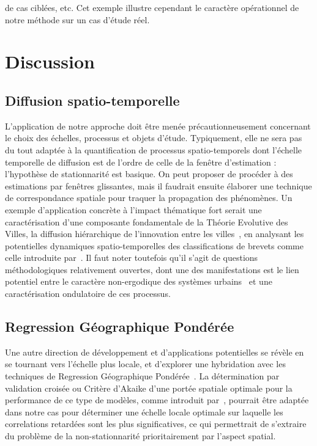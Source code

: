 \documentclass[english]{./sageo}
\begin{document}
de cas ciblées, etc. Cet exemple illustre cependant le caractère opérationnel de notre méthode sur un cas d'étude réel.
 




\section{Discussion}


\subsection{Diffusion spatio-temporelle}


L'application de notre approche doit être menée précautionneusement concernant le choix des échelles, processus et objets d'étude. Typiquement, elle ne sera pas du tout adaptée à la quantification de processus spatio-temporels dont l'échelle temporelle de diffusion est de l'ordre de celle de la fenêtre d'estimation : l'hypothèse de stationnarité est basique. On peut proposer de procéder à des estimations par fenêtres glissantes, mais il faudrait ensuite élaborer une technique de correspondance spatiale pour traquer la propagation des phénomènes. Un exemple d'application concrète à l'impact thématique fort serait une caractérisation d'une composante fondamentale de la Théorie Evolutive des Villes, la diffusion hiérarchique de l'innovation entre les villes~\cite{pumain2010theorie}, en analysant les potentielles dynamiques spatio-temporelles des classifications de brevets comme celle introduite par~\cite{10.1371/journal.pone.0176310}. Il faut noter toutefois qu'il s'agit de questions méthodologiques relativement ouvertes, dont une des manifestations est le lien potentiel entre le caractère non-ergodique des systèmes urbains~\cite{pumain2012urban} et une caractérisation ondulatoire de ces processus.




\subsection{Regression Géographique Pondérée}


Une autre direction de développement et d'applications potentielles se révèle en se tournant vers l'échelle plus locale, et d'explorer une hybridation avec les techniques de Regression Géographique Pondérée~\cite{brunsdon1998geographically}. La détermination par validation croisée ou Critère d'Akaike d'une portée spatiale optimale pour la performance de ce type de modèles, comme introduit par~\cite{2017arXiv170607467R}, pourrait être adaptée dans notre cas pour déterminer une échelle locale optimale sur laquelle les correlations retardées sont les plus significatives, ce qui permettrait de s'extraire du problème de la non-stationnarité prioritairement par l'aspect spatial.
\end{document}
